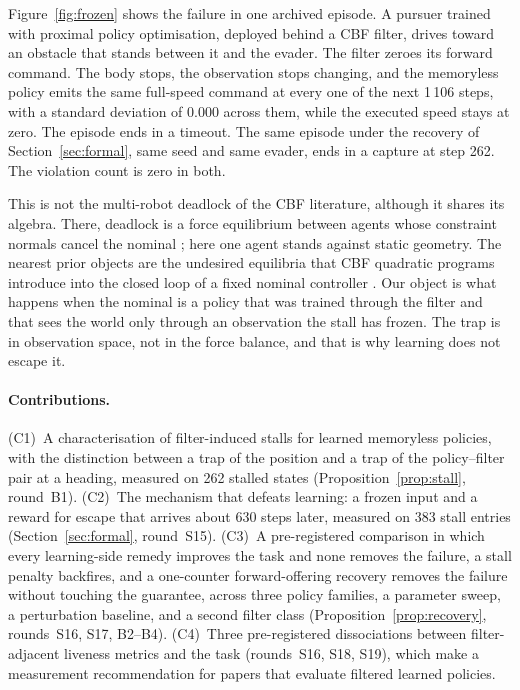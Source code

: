 \documentclass{l4dc2027}
\begin{document}
Figure~\ref{fig:frozen} shows the failure in one archived episode. A pursuer trained with proximal policy optimisation, deployed behind a CBF filter, drives toward an obstacle that stands between it and the evader. The filter zeroes its forward command. The body stops, the observation stops changing, and the memoryless policy emits the same full-speed command at every one of the next 1\,106 steps, with a standard deviation of 0.000 across them, while the executed speed stays at zero. The episode ends in a timeout. The same episode under the recovery of Section~\ref{sec:formal}, same seed and same evader, ends in a capture at step 262. The violation count is zero in both.

This is not the multi-robot deadlock of the CBF literature, although it shares its algebra. There, deadlock is a force equilibrium between agents whose constraint normals cancel the nominal \citep{grover2020symmetry,grover2021deadlock,grover2023before}; here one agent stands against static geometry. The nearest prior objects are the undesired equilibria that CBF quadratic programs introduce into the closed loop of a fixed nominal controller \citep{reis2021cbfqp,tan2024undesired}. Our object is what happens when the nominal is a policy that was trained through the filter and that sees the world only through an observation the stall has frozen. The trap is in observation space, not in the force balance, and that is why learning does not escape it.

\paragraph{Contributions.} (C1)~A characterisation of filter-induced stalls for learned memoryless policies, with the distinction between a trap of the position and a trap of the policy--filter pair at a heading, measured on 262 stalled states (Proposition~\ref{prop:stall}, round~B1). (C2)~The mechanism that defeats learning: a frozen input and a reward for escape that arrives about 630 steps later, measured on 383 stall entries (Section~\ref{sec:formal}, round~S15). (C3)~A pre-registered comparison in which every learning-side remedy improves the task and none removes the failure, a stall penalty backfires, and a one-counter forward-offering recovery removes the failure without touching the guarantee, across three policy families, a parameter sweep, a perturbation baseline, and a second filter class (Proposition~\ref{prop:recovery}, rounds~S16, S17, B2--B4). (C4)~Three pre-registered dissociations between filter-adjacent liveness metrics and the task (rounds~S16, S18, S19), which make a measurement recommendation for papers that evaluate filtered learned policies.
\end{document}
